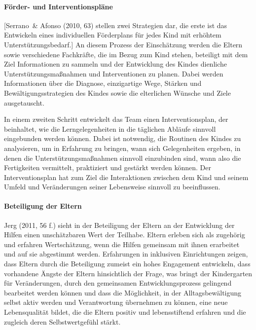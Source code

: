 \paragraph{Förder- und Interventionspläne} 
[Serrano~\& Afonso (2010, 63) stellen zwei Strategien dar, die erste ist das Entwickeln eines individuellen Förderplans für jedes Kind mit erhöhtem Unterstützungsbedarf.] An diesem Prozess der Einschätzung werden die Eltern sowie verschiedene Fachkräfte, die im Bezug zum Kind stehen, beteiligt mit dem Ziel Informationen zu sammeln und der Entwicklung des Kindes dienliche Unterstützungsmaßnahmen und Interventionen zu planen. Dabei werden Informationen über die Diagnose, einzigartige Wege, Stärken und Bewältigungsstrategien des Kindes sowie die elterlichen Wünsche und Ziele ausgetauscht. 

In einem zweiten Schritt entwickelt das Team einen Interventionsplan, der beinhaltet, wie die Lerngelegenheiten in die täglichen Abläufe sinnvoll eingebunden werden können. Dabei ist notwendig, die Routinen des Kindes zu analysieren, um in Erfahrung zu bringen, wann sich Gelegenheiten ergeben, in denen die Unterstützungsmaßnahmen sinnvoll einzubinden sind, wann also die Fertigkeiten vermittelt, praktiziert und gestärkt werden können. Der Interventionsplan hat zum Ziel die Interaktionen zwischen dem Kind und seinem Umfeld und Veränderungen seiner Lebensweise sinnvoll zu beeinflussen.  

\paragraph{Beteiligung der Eltern} Jerg (2011, 56 f.) sieht in der Beteiligung der Eltern an der Entwicklung der Hilfen einen unschätzbaren Wert der Teilhabe. Eltern erleben sich als zugehörig und erfahren Wertschätzung, wenn die Hilfen gemeinsam mit ihnen erarbeitet und auf sie abgestimmt werden. Erfahrungen in inklusiven Einrichtungen zeigen, dass Eltern durch die Beteiligung zumeist ein hohes Engagement entwickeln, dass vorhandene Ängste der Eltern hinsichtlich der Frage, was bringt der Kindergarten für Veränderungen, durch den gemeinsamen Entwicklungsprozess gelingend bearbeitet werden können und dass die Möglichkeit, in der Alltagsbewältigung selbst aktiv werden und Verantwortung übernehmen zu können, eine neue Lebensqualität bildet, die die Eltern positiv und lebensstiftend erfahren und die zugleich deren Selbstwertgefühl stärkt.     

